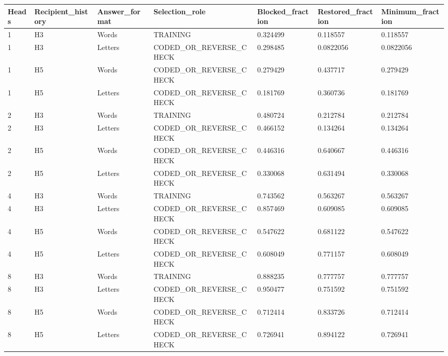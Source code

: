 \begin{tabular}{lllllll}
Heads & Recipient\_history & Answer\_format & Selection\_role & Blocked\_fraction & Restored\_fraction & Minimum\_fraction \\
\hline
1 & H3 & Words & TRAINING & 0.324499 & 0.118557 & 0.118557 \\
1 & H3 & Letters & CODED\_OR\_REVERSE\_CHECK & 0.298485 & 0.0822056 & 0.0822056 \\
1 & H5 & Words & CODED\_OR\_REVERSE\_CHECK & 0.279429 & 0.437717 & 0.279429 \\
1 & H5 & Letters & CODED\_OR\_REVERSE\_CHECK & 0.181769 & 0.360736 & 0.181769 \\
2 & H3 & Words & TRAINING & 0.480724 & 0.212784 & 0.212784 \\
2 & H3 & Letters & CODED\_OR\_REVERSE\_CHECK & 0.466152 & 0.134264 & 0.134264 \\
2 & H5 & Words & CODED\_OR\_REVERSE\_CHECK & 0.446316 & 0.640667 & 0.446316 \\
2 & H5 & Letters & CODED\_OR\_REVERSE\_CHECK & 0.330068 & 0.631494 & 0.330068 \\
4 & H3 & Words & TRAINING & 0.743562 & 0.563267 & 0.563267 \\
4 & H3 & Letters & CODED\_OR\_REVERSE\_CHECK & 0.857469 & 0.609085 & 0.609085 \\
4 & H5 & Words & CODED\_OR\_REVERSE\_CHECK & 0.547622 & 0.681122 & 0.547622 \\
4 & H5 & Letters & CODED\_OR\_REVERSE\_CHECK & 0.608049 & 0.771157 & 0.608049 \\
8 & H3 & Words & TRAINING & 0.888235 & 0.777757 & 0.777757 \\
8 & H3 & Letters & CODED\_OR\_REVERSE\_CHECK & 0.950477 & 0.751592 & 0.751592 \\
8 & H5 & Words & CODED\_OR\_REVERSE\_CHECK & 0.712414 & 0.833726 & 0.712414 \\
8 & H5 & Letters & CODED\_OR\_REVERSE\_CHECK & 0.726941 & 0.894122 & 0.726941 \\
\end{tabular}

